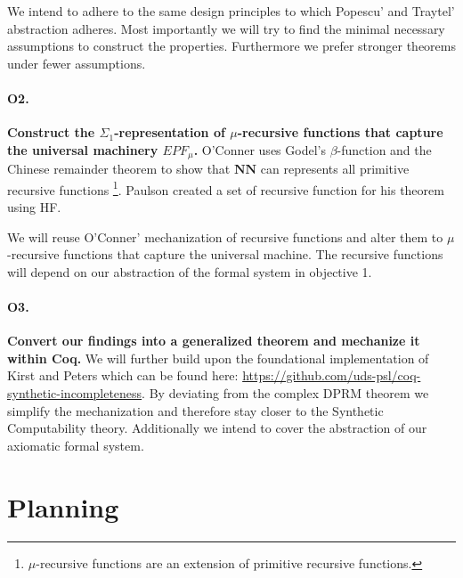 \documentclass[a4paper]{scrartcl}
\begin{document}
We intend to adhere to the same design principles to which Popescu' and Traytel' abstraction adheres.\cite{popescu}  Most importantly we will try to find the minimal necessary assumptions to construct the properties. Furthermore we prefer stronger theorems under fewer assumptions.

\paragraph{O2.}
\textbf{Construct the $\Sigma_1$-representation of $\mu$-recursive functions that capture the universal machinery $EPF_\mu$.}
O'Conner uses Godel’s $\beta$-function and the Chinese remainder theorem to show that $\mathbf{NN}$ can represents all primitive recursive functions \footnote{$\mu$-recursive functions are an extension of primitive recursive functions.}.\cite{O_Connor_2005} 
Paulson created a set of recursive function for his theorem using HF.\cite{Paulson_2015}

We will reuse O'Conner' mechanization of recursive functions and alter them to $\mu$-recursive functions that capture the universal machine. The recursive functions will depend on our abstraction of the formal system in objective 1.

\paragraph{O3.}
\textbf{Convert our findings into a generalized theorem and mechanize it within Coq.}
We will further build upon the foundational implementation of Kirst and Peters which can be found here: \url{https://github.com/uds-psl/coq-synthetic-incompleteness}. By deviating from the complex DPRM theorem we simplify the mechanization and therefore stay closer to the Synthetic Computability theory. Additionally we intend to cover the abstraction of our axiomatic formal system.

\section{Planning}
\label{sec:planning}


\end{document}
